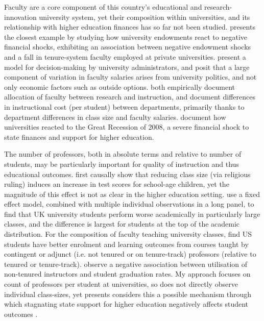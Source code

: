 \documentclass[notitlepage,12pt]{article}
\begin{document}
Faculty are a core component of this country's educational and research-innovation university system, yet their composition within universities, and its relationship with higher education finances has so far not been studied.
\cite{brown2014endowment} presents the closest example by studying how university endowments react to negative financial shocks, exhibiting an association between negative endowment shocks and a fall in tenure-system faculty employed at private universities.
\cite{abe2015implications} present a model for decision-making by university administrators, and posit that a large component of variation in faculty salaries arises from university politics, and not only economic factors such as outside options.
\cite{johnson2009jep,NBERc13879} both empirically document allocation of faculty between research and instruction, and \cite{hemelt2021math} document differences in instructional cost (per student) between departments, primarily thanks to department differences in class size and faculty salaries.
\cite{turner2014impact} document how universities reacted to the Great Recession of 2008, a severe financial shock to state finances and support for higher education.

The number of professors, both in absolute terms and relative to number of students, may be particularly important for quality of instruction and thus educational outcomes.
\cite{angrist1999using} first causally show that reducing class size (via religious ruling) induces an increase in test scores for school-age children, yet the magnitude of this effect is not as clear in the higher education setting.
\cite{bandiera2010heterogeneous} use a fixed effect model, combined with multiple individual observations in a long panel, to find that UK university students perform worse academically in particularly large classes, and the difference is largest for students at the top of the academic distribution.
For the composition of faculty teaching university classes, \cite{bettinger2010does,figlio2015tenure} find US students have better enrolment and learning outcomes from courses taught by contingent or adjunct (i.e. not tenured or on tenure-track) professors (relative to tenured or tenure-track).
\cite{ehrenberg2005tenured} observe a negative association between utilisation of non-tenured instructors and student graduation rates.
My approach focuses on count of professors per student at universities, so does not directly observe individual class-sizes, yet presents considers this a possible mechanism through which stagnating state support for higher education negatively affects student outcomes \citep{NBERw23736,NBERw27885}.
\end{document}
